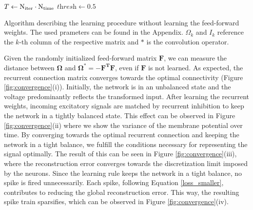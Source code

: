 \documentclass[twoside,11pt]{article}
\begin{document}
\vspace{1cm}
\IncMargin{1em}
\begin{algorithm}[H]
  \DontPrintSemicolon
  \label{algorithm_simulation}
  \BlankLine
  $T \leftarrow \textnormal{N}_\textnormal{iter} \cdot \textnormal{N}_{\textnormal{time}}$\;
  $\textit{thresh} \leftarrow 0.5$ \;
  \caption{Algorithm describing the learning procedure without learning the feed-forward weights.
  The used prameters can be found in the Appendix.  $\Omega_k$ and $I_k$ reference the
  $k$-th column of the respective matrix and $\ast$ is the convolution operator.}
\end{algorithm}
\DecMargin{1em}
\vspace{1cm}

Given the randomly initialized feed-forward matrix $\mathbf{F}$, we can measure the distance
between $\mathbf{\Omega}$ and $\mathbf{\Omega}^* = \mathbf{-F^TF}$, even if $\mathbf{F}$ is not learned.
As expected, the recurrent connection matrix converges towards the
optimal connectivity (Figure \ref{fig:convergence}(i)).
Initially, the network is in an unbalanced state and the
voltage predominantly reflects the transformed input.
After learning the recurrent weights, incoming excitatory signals are matched by
recurrent inhibition to keep the network in a tightly balanced state. This effect can be
observed in Figure \ref{fig:convergence}(ii) where we show the variance of the
membrane potential over time. By converging towards the optimal recurrent connection
and keeping the network in a tight balance, we fulfill the conditions necessary
for representing the signal optimally. The result of this can be seen
in Figure \ref{fig:convergence}(iii), where
the reconstruction error converges towards the discretization limit imposed by the
neurons. Since the learning rule keeps the network in a tight balance, no spike is fired
unnecessarily. Each spike, following Equation \ref{loss_smaller}, contributes
to reducing the global reconstruction error. This way, the resulting spike train sparsifies,
which can be observed in Figure \ref{fig:convergence}(iv). \\
\end{document}
